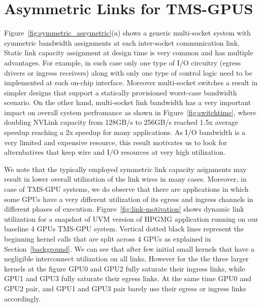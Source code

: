 \section{Asymmetric Links for TMS-GPUS}
\label{interconnect}

Figure~\ref{fig:symmetric_assymetric}(a) shows a generic multi-socket system
with symmetric bandwidth assignments at each inter-socket communication link.
Static link capacity assignment at design time is very common and has multiple
advantages. For example, in such case only one type of I/O circuitry (egress
drivers or ingress receivers) along with only one type of control logic need to
be implemented at each on-chip interface. Moreover multi-socket switches a
result in simpler designs that support a statically provisioned worst-case
bandwidth scenario. On the other hand, multi-socket link bandwidth has a very
important impact on overall system perfromance as shown in
Figure~\ref{fig:switchtime}, where doubling NVLink capacity from 128GB/s to
256GB/s reached 1.5x average speedup reaching a 2x speedup for many
applications. As I/O bandwidth is a very limited and expensive resource, this
result motivates us to look for alternbatives that keep wire and I/O resources
at very high utilization. 

We note that the typically employed symmetric link
capacity asignments may result in lower overall utilization of the link wires
in many cases. Moreover, in case of TMS-GPU systems, we do observe that there
are applications in which some GPUs have a very different utilization of its
egress and ingress channels in different phases of execution.
Figure~\ref{fig:link-motivation} shows dynamic link utilization for a snapshot
of UVM version of HPGMG application running on our baseline 4 GPUs TMS-GPU
system. Vertical dotted black lines represent the beginning kernel calls that
are split across 4 GPUs as explained in Section~\ref{background}. We can see
that after few initial small kernels that have a negligible interconnect
utilization on all links, However for the the three larger kernels at the
figure GPU0 and GPU2 fully saturate their ingress links, while GPU1 and GPU3
fully saturate their egress links. At the same time GPU0 and GPU2 pair,
and GPU1 and GPU3 pair barely use their egress or ingress links accordingly.

